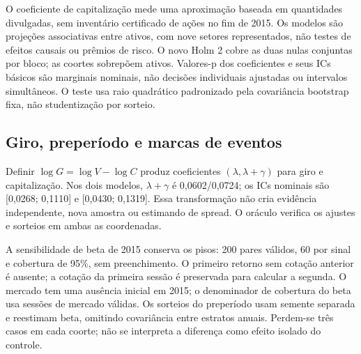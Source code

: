 \documentclass[12 pt]{article}
\begin{document}
O coeficiente de capitalização mede uma aproximação baseada em
quantidades divulgadas, sem inventário certificado de ações no fim de
2015. Os modelos são projeções associativas entre ativos, com nove
setores representados, não testes de efeitos causais ou prêmios de risco.
O novo Holm 2 cobre as duas nulas conjuntas por bloco; as coortes
sobrepõem ativos. Valores-p dos coeficientes e seus ICs básicos são
marginais nominais, não decisões individuais ajustadas ou intervalos
simultâneos. O teste usa raio quadrático padronizado pela covariância
bootstrap fixa, não studentização por sorteio.

\begin{table}[htbp]\centering\small
\caption{Referência de porte e setor, bloco 21. $p^*$: conjunto, Holm 2.}
\resizebox{\textwidth}{!}{}
\end{table}
\begin{table}[htbp]\centering\small
\caption{Referência, bloco 5. Mesmos casos e família, outra escolha de bloco.}
\resizebox{\textwidth}{!}{}
\end{table}
\begin{table}[htbp]\centering\small
\caption{Referência, bloco 63. Não há proteção global entre escolhas.}
\resizebox{\textwidth}{!}{}
\end{table}

\subsection{Giro, preperíodo e marcas de eventos}
Definir $\log G=\log V-\log C$ produz coeficientes
$(\lambda,\lambda+\gamma)$ para giro e capitalização.
Nos dois modelos, $\lambda+\gamma$ é 0,0602/0,0724; os ICs nominais
são [0,0268; 0,1110] e [0,0430; 0,1319]. Essa transformação não
cria evidência independente, nova amostra ou estimando de spread.
O oráculo verifica os ajustes e sorteios em ambas as coordenadas.

A sensibilidade de beta de 2015 conserva os pisos: 200 pares válidos,
60 por sinal e cobertura de 95\%, sem preenchimento. O primeiro retorno
sem cotação anterior é ausente; a cotação da primeira sessão é preservada
para calcular a segunda. O mercado tem uma ausência inicial em 2015;
o denominador de cobertura do beta usa sessões de mercado válidas.
Os sorteios do preperíodo usam semente separada e reestimam beta,
omitindo covariância entre estratos anuais. Perdem-se três casos em
cada coorte; não se interpreta a diferença como efeito isolado do controle.
\end{document}
